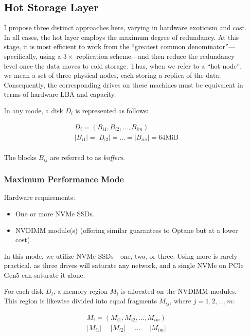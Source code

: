\documentclass[a4paper,12pt]{article}
\begin{document}
    \subsection{Hot Storage Layer}

    I propose three distinct approaches here, varying in hardware exoticism and cost. In all cases, the hot layer employs the maximum degree of redundancy. At this stage, it is most efficient to work from the \enquote{greatest common denominator}—specifically, using a $3\times$ replication scheme—and then reduce the redundancy level once the data moves to cold storage. Thus, when we refer to a \enquote{hot node}, we mean a set of three physical nodes, each storing a replica of the data. Consequently, the corresponding drives on these machines must be equivalent in terms of hardware LBA and capacity.

    In any mode, a disk $D_i$ is represented as follows:

    \begin{gather*}
        D_i = \left(B_{i1}, B_{i2}, \dots, B_{im}\right)\\
        |B_{i1}| = |B_{i2}| = \dots = |B_{im}| = 64\text{MiB}\\
    \end{gather*}

    The blocks $B_{ij}$ are referred to as \textit{buffers}.

    \subsubsection{Maximum Performance Mode}

    Hardware requirements:

    \begin{itemize}
        \item One or more NVMe SSDs.
        \item NVDIMM module(s) (offering similar guarantees to Optane but at a lower cost).
    \end{itemize}

    In this mode, we utilize NVMe SSDs—one, two, or three. Using more is rarely practical, as three drives will saturate any network, and a single NVMe on PCIe Gen5 can saturate it alone.

    \smallskip
    For each disk $D_i$, a memory region $M_i$ is allocated on the NVDIMM modules. This region is likewise divided into equal fragments $M_{ij}$, where $j = 1, 2, \dots, m$:

    \begin{gather*}
        M_i = \left(M_{i1}, M_{i2}, \dots, M_{im}\right)\\
        |M_{i1}| = |M_{i2}| = \dots = |M_{im}|\\
    \end{gather*}
\end{document}
